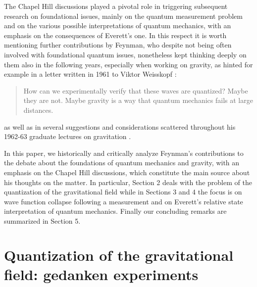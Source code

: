 \documentclass{ws-procs961x669}            %
\begin{document}
The Chapel Hill discussions played a pivotal role in triggering
subsequent research on foundational issues, mainly on the quantum
measurement problem and on the various possible interpretations of
quantum mechanics, with an emphasis on the consequences of
Everett's one. In this respect it is worth mentioning further
contributions by Feynman, who despite not being often involved
with foundational quantum issues, nonetheless kept thinking deeply
on them also in the following years, especially when working on
gravity, as hinted for example in a letter written in 1961 to
Viktor Weisskopf \cite{WeisskopfLetter}:
\begin{quote}
How can we experimentally verify that these waves are quantized?
Maybe they are not. Maybe gravity is a way that quantum mechanics
fails at large distances.
\end{quote}
as well as in several suggestions and considerations scattered
throughout his 1962-63 graduate lectures on gravitation
\cite{Feynman:1996kb}.

In this paper, we historically and critically analyze Feynman's
contributions to the debate about the foundations of quantum
mechanics and gravity, with an emphasis on the Chapel Hill
discussions, which constitute the main source about his thoughts
on the matter. In particular, Section 2 deals with the problem of
the quantization of the gravitational field while in Sections 3
and 4 the focus is on wave function collapse following a
measurement and on Everett's relative state interpretation of
quantum mechanics. Finally our concluding remarks are summarized
in Section 5.



\section{Quantization of the gravitational field: gedanken experiments}
\end{document}
